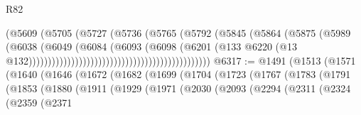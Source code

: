 \begin{lexlean}{R82}
\begin{coremodule}
                                                              (@5609
                                                                (@5705
                                                                  (@5727
                                                                    (@5736
                                                                      (@5765
                                                                        (@5792
                                                                          (@5845
                                                                            (@5864
                                                                              (@5875
                                                                                (@5989
                                                                                  (@6038
                                                                                    (@6049
                                                                                      (@6084
                                                                                        (@6093
                                                                                          (@6098
                                                                                            (@6201
                                                                                              (@133
                                                                                                @6220
                                                                                                (@13
                                                                                                  @132)))))))))))))))))))))))))))))))))))))))))))))))
@6317 := @1491
    (@1513
      (@1571
        (@1640
          (@1646
            (@1672
              (@1682
                (@1699
                  (@1704
                    (@1723
                      (@1767
                        (@1783
                          (@1791
                            (@1853
                              (@1880
                                (@1911
                                  (@1929
                                    (@1971
                                      (@2030
                                        (@2093
                                          (@2294
                                            (@2311
                                              (@2324
                                                (@2359
                                                  (@2371

\end{coremodule}
\end{lexlean}
